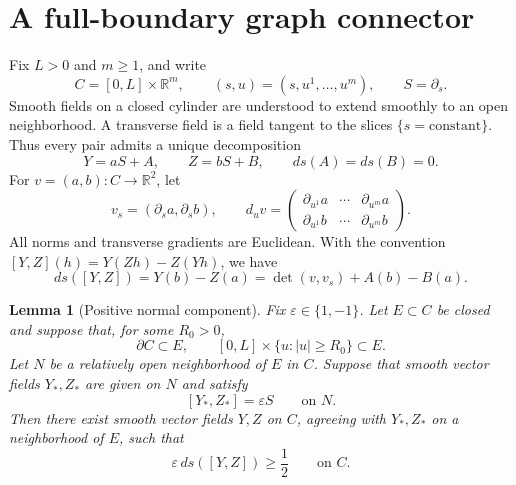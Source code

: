 \documentclass[11pt]{article}
\newtheorem{lemma}[theorem]{Lemma}
\theoremstyle{remark}
\begin{document}
\section{A full-boundary graph connector}\label{sec:graph}

Fix $L>0$ and $m\geq 1$, and write
$$
    C=[0,L]\times\mathbb R^m,
  \qquad (s,u)=(s,u^1,\ldots,u^m),
  \qquad S=\partial_s.
$$
Smooth fields on a closed cylinder are understood to extend smoothly to an open neighborhood. A transverse field is a field tangent to the slices $\{s=\mathrm{constant}\}$. Thus every pair admits a unique
decomposition
$$
  Y=aS+A,\qquad Z=bS+B,
  \qquad ds(A)=ds(B)=0.
$$
For $v=(a,b):C\to\mathbb R^2$, let
$$
  v_s=(\partial_s a,\partial_s b),
  \qquad
  d_uv=
  \begin{pmatrix}
    \partial_{u^1}a & \cdots & \partial_{u^m}a\\
    \partial_{u^1}b & \cdots & \partial_{u^m}b
  \end{pmatrix}.
$$
All norms and transverse gradients are Euclidean. With the convention $[Y,Z](h)=Y(Zh)-Z(Yh)$, we have
\begin{equation}\label{eq:normal}\tag{4.1}
  ds([Y,Z])
  =Y(b)-Z(a)
  =\det(v,v_s)+A(b)-B(a).
\end{equation}

\begin{lemma}[Positive normal component]
\label{lem:positive}
Fix $\varepsilon\in\{1,-1\}$. Let $E\subset C$ be closed and
suppose that, for some $R_0>0$,
$$
  \partial C\subset E,
  \qquad
  [0,L]\times\{u:|u|\geq R_0\}\subset E.
$$
Let $N$ be a relatively open neighborhood of $E$ in $C$.
Suppose that smooth vector fields $Y_*,Z_*$ are given on $N$ and
satisfy
$$
  [Y_*,Z_*]=\varepsilon S
  \qquad\text{on }N.
$$
Then there exist smooth vector fields $Y,Z$ on $C$,
agreeing with $Y_*,Z_*$ on a neighborhood of $E$, such that
$$
  \varepsilon\,ds([Y,Z])\geq\frac12
  \qquad\text{on }C.
$$
\end{lemma}
\end{document}
